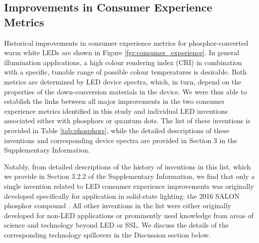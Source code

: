\documentclass[journal=jacsat,manuscript=article]{achemso}
\begin{document}
\subsection{Improvements in Consumer Experience Metrics}

Historical improvements in consumer experience metrics for phosphor-converted warm white LEDs are shown in Figure \ref{fgr:consumer_experience}. In general illumination applications, a high colour rendering index (CRI) in combination with a specific, tunable range of possible colour temperatures is desirable. Both metrics are determined by LED device spectra, which, in turn, depend on the properties of the down-conversion materials in the device. We were thus able to establish the links between all major improvements in the two consumer experience metrics identified in this study and individual LED inventions associated either with phosphors or quantum dots. The list of these inventions is provided in Table \ref{tab:phosphors}, while the detailed descriptions of these inventions and corresponding device spectra are provided in Section 3 in the Supplementary Information.

Notably, from detailed descriptions of the history of inventions in this list, which we provide in Section 3.2.2 of the Supplementary Information, we find that only a single invention related to LED consumer experience improvements was originally developed specifically for application in solid-state lighting: the 2016 SALON phosphor compound \cite{seibald2019phosphor,Hoerder2019}. All other inventions in the list were either originally developed for non-LED applications or prominently used knowledge from areas of science and technology beyond LED or SSL. We discuss the details of the corresponding technology spillovers in the Discussion section below.
\end{document}
